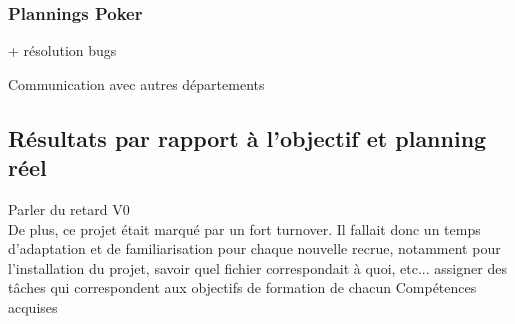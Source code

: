 \subsubsection{Plannings Poker}


+ résolution bugs

Communication avec autres départements

\pagebreak
\subsection{Résultats par rapport à l'objectif et planning réel}

Parler du retard V0
\\De plus, ce projet était marqué par un fort turnover. Il fallait donc un temps d'adaptation et de familiarisation pour chaque nouvelle recrue, notamment pour l'installation du projet, savoir quel fichier correspondait à quoi, etc...
assigner des tâches qui correspondent aux objectifs de formation de chacun
Compétences acquises









